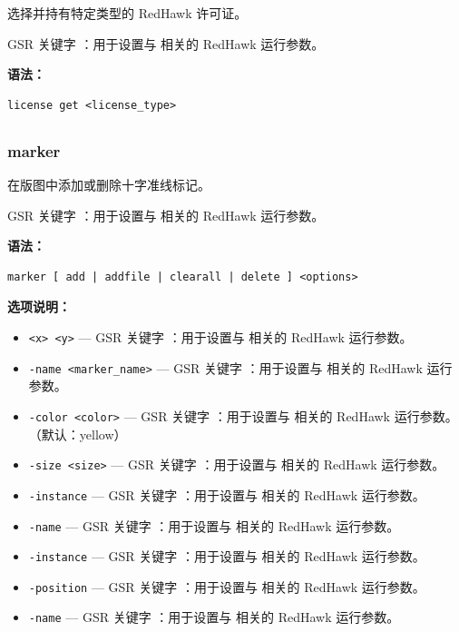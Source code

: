选择并持有特定类型的 RedHawk 许可证。

GSR 关键字 ：用于设置与  相关的 RedHawk 运行参数。

\textbf{语法：}
\begin{lstlisting}
license get <license_type>
\end{lstlisting}

\subsection{}
\subsubsection*{marker}

在版图中添加或删除十字准线标记。

GSR 关键字 ：用于设置与  相关的 RedHawk 运行参数。

\textbf{语法：}
\begin{lstlisting}
marker [ add | addfile | clearall | delete ] <options>
\end{lstlisting}

\textbf{选项说明：}
\begin{itemize}
\item \texttt{<x> <y>} — GSR 关键字 ：用于设置与  相关的 RedHawk 运行参数。
\item \texttt{-name <marker\_name>} — GSR 关键字 ：用于设置与  相关的 RedHawk 运行参数。
\item \texttt{-color <color>} — GSR 关键字 ：用于设置与  相关的 RedHawk 运行参数。（默认：yellow）
\item \texttt{-size <size>} — GSR 关键字 ：用于设置与  相关的 RedHawk 运行参数。
\item \texttt{-instance} — GSR 关键字 ：用于设置与  相关的 RedHawk 运行参数。
\item \texttt{-name} — GSR 关键字 ：用于设置与  相关的 RedHawk 运行参数。
\item \texttt{-instance} — GSR 关键字 ：用于设置与  相关的 RedHawk 运行参数。
\item \texttt{-position} — GSR 关键字 ：用于设置与  相关的 RedHawk 运行参数。
\item \texttt{-name} — GSR 关键字 ：用于设置与  相关的 RedHawk 运行参数。
\end{itemize}

\subsection{}
